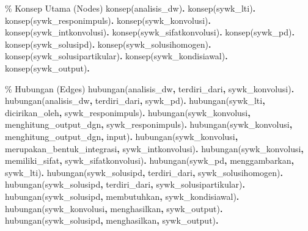 \documentclass[
  letterpaper,
  DIV=11,
  numbers=noendperiod]{scrreprt}
\newenvironment{Shaded}{\begin{snugshade}}{\end{snugshade}}
\newcommand{\CommentTok}[1]{\textcolor[rgb]{0.37,0.37,0.37}{#1}}
\newcommand{\KeywordTok}[1]{\textcolor[rgb]{0.00,0.23,0.31}{\textbf{#1}}}
\newcommand{\NormalTok}[1]{\textcolor[rgb]{0.00,0.23,0.31}{#1}}
\begin{document}
\begin{Shaded}
\begin{Highlighting}[]
\CommentTok{\% Konsep Utama (Nodes)}
\NormalTok{konsep(analisis\_dw)}\KeywordTok{.}
\NormalTok{konsep(sywk\_lti)}\KeywordTok{.}
\NormalTok{konsep(sywk\_responimpuls)}\KeywordTok{.}
\NormalTok{konsep(sywk\_konvolusi)}\KeywordTok{.}
\NormalTok{konsep(sywk\_intkonvolusi)}\KeywordTok{.}
\NormalTok{konsep(sywk\_sifatkonvolusi)}\KeywordTok{.}
\NormalTok{konsep(sywk\_pd)}\KeywordTok{.}
\NormalTok{konsep(sywk\_solusipd)}\KeywordTok{.}
\NormalTok{konsep(sywk\_solusihomogen)}\KeywordTok{.}
\NormalTok{konsep(sywk\_solusipartikular)}\KeywordTok{.}
\NormalTok{konsep(sywk\_kondisiawal)}\KeywordTok{.}
\NormalTok{konsep(sywk\_output)}\KeywordTok{.}

\CommentTok{\% Hubungan (Edges)}
\NormalTok{hubungan(analisis\_dw}\KeywordTok{,}\NormalTok{ terdiri\_dari}\KeywordTok{,}\NormalTok{ sywk\_konvolusi)}\KeywordTok{.}
\NormalTok{hubungan(analisis\_dw}\KeywordTok{,}\NormalTok{ terdiri\_dari}\KeywordTok{,}\NormalTok{ sywk\_pd)}\KeywordTok{.}
\NormalTok{hubungan(sywk\_lti}\KeywordTok{,}\NormalTok{ dicirikan\_oleh}\KeywordTok{,}\NormalTok{ sywk\_responimpuls)}\KeywordTok{.}
\NormalTok{hubungan(sywk\_konvolusi}\KeywordTok{,}\NormalTok{ menghitung\_output\_dgn}\KeywordTok{,}\NormalTok{ sywk\_responimpuls)}\KeywordTok{.}
\NormalTok{hubungan(sywk\_konvolusi}\KeywordTok{,}\NormalTok{ menghitung\_output\_dgn}\KeywordTok{,}\NormalTok{ input)}\KeywordTok{.}
\NormalTok{hubungan(sywk\_konvolusi}\KeywordTok{,}\NormalTok{ merupakan\_bentuk\_integrasi}\KeywordTok{,}\NormalTok{ sywk\_intkonvolusi)}\KeywordTok{.}
\NormalTok{hubungan(sywk\_konvolusi}\KeywordTok{,}\NormalTok{ memiliki\_sifat}\KeywordTok{,}\NormalTok{ sywk\_sifatkonvolusi)}\KeywordTok{.}
\NormalTok{hubungan(sywk\_pd}\KeywordTok{,}\NormalTok{ menggambarkan}\KeywordTok{,}\NormalTok{ sywk\_lti)}\KeywordTok{.}
\NormalTok{hubungan(sywk\_solusipd}\KeywordTok{,}\NormalTok{ terdiri\_dari}\KeywordTok{,}\NormalTok{ sywk\_solusihomogen)}\KeywordTok{.}
\NormalTok{hubungan(sywk\_solusipd}\KeywordTok{,}\NormalTok{ terdiri\_dari}\KeywordTok{,}\NormalTok{ sywk\_solusipartikular)}\KeywordTok{.}
\NormalTok{hubungan(sywk\_solusipd}\KeywordTok{,}\NormalTok{ membutuhkan}\KeywordTok{,}\NormalTok{ sywk\_kondisiawal)}\KeywordTok{.}
\NormalTok{hubungan(sywk\_konvolusi}\KeywordTok{,}\NormalTok{ menghasilkan}\KeywordTok{,}\NormalTok{ sywk\_output)}\KeywordTok{.}
\NormalTok{hubungan(sywk\_solusipd}\KeywordTok{,}\NormalTok{ menghasilkan}\KeywordTok{,}\NormalTok{ sywk\_output)}\KeywordTok{.}
\end{Highlighting}
\end{Shaded}
\end{document}
